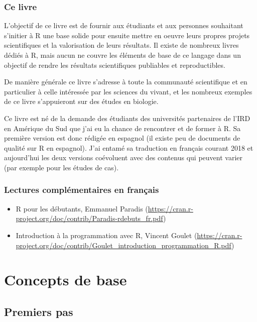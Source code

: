 \documentclass[]{book}
\providecommand{\tightlist}{%
  \setlength{\itemsep}{0pt}\setlength{\parskip}{0pt}}
\theoremstyle{definition}
\theoremstyle{definition}
\theoremstyle{definition}
\theoremstyle{remark}
\begin{document}
\section{Ce livre}\label{ce-livre}

L'objectif de ce livre est de fournir aux étudiants et aux personnes
souhaitant s'initier à R une base solide pour ensuite mettre en oeuvre
leurs propres projets scientifiques et la valorisation de leurs
résultats. Il existe de nombreux livres dédiés à R, mais aucun ne couvre
les éléments de base de ce langage dans un objectif de rendre les
résultats scientifiques publiables et reproductibles.

De manière générale ce livre s'adresse à toute la communauté
scientifique et en particulier à celle intéressée par les sciences du
vivant, et les nombreux exemples de ce livre s'appuieront sur des études
en biologie.

Ce livre est né de la demande des étudiants des universités partenaires
de l'IRD en Amérique du Sud que j'ai eu la chance de rencontrer et de
former à R. Sa première version est donc rédigée en espagnol (il existe
peu de documents de qualité sur R en espagnol). J'ai entamé sa
traduction en français courant 2018 et aujourd'hui les deux versions
coévoluent avec des contenus qui peuvent varier (par exemple pour les
études de cas).

\section{Lectures complémentaires en
français}\label{lectures-complementaires-en-francais}

\begin{itemize}
\tightlist
\item
  R pour les débutants, Emmanuel Paradis
  (\url{https://cran.r-project.org/doc/contrib/Paradis-rdebuts_fr.pdf})
\item
  Introduction à la programmation avec R, Vincent Goulet
  (\url{https://cran.r-project.org/doc/contrib/Goulet_introduction_programmation_R.pdf})
\end{itemize}

\part{Concepts de base}\label{part-concepts-de-base}

\chapter{Premiers pas}\label{premiersPas}
\end{document}
